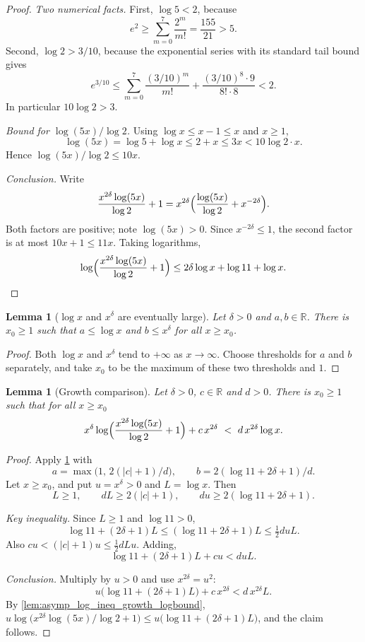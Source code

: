 \documentclass[11pt]{article}
\newtheorem{lemma}[theorem]{Lemma}
\theoremstyle{definition}
\theoremstyle{remark}
\begin{document}
\begin{proof}
\emph{Two numerical facts.} First, $\log 5<2$, because
\[
e^2\ge\sum_{m=0}^{7}\frac{2^m}{m!}=\frac{155}{21}>5.
\]
Second, $\log 2>3/10$, because the exponential series with its standard tail bound gives
\[
e^{3/10}\le\sum_{m=0}^{7}\frac{(3/10)^m}{m!}+\frac{(3/10)^8\cdot 9}{8!\cdot 8}<2.
\]
In particular $10\log2>3$.

\emph{Bound for $\log(5x)/\log 2$.} Using $\log x\le x-1\le x$ and $x\ge1$,
\[
\log(5x)=\log5+\log x\le 2+x\le 3x<10\log2\cdot x .
\]
Hence $\log(5x)/\log 2\le 10x$.

\emph{Conclusion.} Write
\[
\frac{x^{2\delta}\log(5x)}{\log2}+1=x^{2\delta}\Bigl(\frac{\log(5x)}{\log 2}+x^{-2\delta}\Bigr).
\]
Both factors are positive; note $\log(5x)>0$. Since $x^{-2\delta}\le1$, the second factor is at most $10x+1\le 11x$. Taking logarithms,
\[
\log\Bigl(\frac{x^{2\delta}\log(5x)}{\log2}+1\Bigr)\le 2\delta\log x+\log 11+\log x. \qedhere
\]
\end{proof}

\begin{lemma}[$\log x$ and $x^\delta$ are eventually large]\label{lem:asymp_log_ineq_growth_eventually}
Let $\delta>0$ and $a,b\in\mathbb{R}$. There is $x_0\ge1$ such that $a\le\log x$ and $b\le x^\delta$ for all $x\ge x_0$.
\end{lemma}

\begin{proof}
Both $\log x$ and $x^\delta$ tend to $+\infty$ as $x\to\infty$. Choose thresholds for $a$ and $b$ separately, and take $x_0$ to be the maximum of these two thresholds and $1$.
\end{proof}

\begin{lemma}[Growth comparison]\label{lem:asymp_log_ineq_growth}
Let $\delta>0$, $c\in\mathbb{R}$ and $d>0$. There is $x_0\ge1$ such that for all $x\ge x_0$
\[
x^{\delta}\log\Bigl(\frac{x^{2\delta}\log(5x)}{\log 2}+1\Bigr)+c\,x^{2\delta}\ <\ d\,x^{2\delta}\log x .
\]
\end{lemma}

\begin{proof}
Apply \cref{lem:asymp_log_ineq_growth_eventually} with
\[
a=\max\bigl(1,\,2(|c|+1)/d\bigr),\qquad b=2(\log 11+2\delta+1)/d .
\]
Let $x\ge x_0$, and put $u=x^\delta>0$ and $L=\log x$. Then
\[
L\ge1,\qquad dL\ge 2(|c|+1),\qquad du\ge 2(\log11+2\delta+1).
\]

\emph{Key inequality.} Since $L\ge1$ and $\log 11>0$,
\[
\log 11+(2\delta+1)L\le(\log11+2\delta+1)L\le\tfrac12 duL.
\]
Also $cu<(|c|+1)u\le\tfrac12 dLu$. Adding,
\[
\log 11+(2\delta+1)L+cu<duL.
\]

\emph{Conclusion.} Multiply by $u>0$ and use $x^{2\delta}=u^2$:
\[
u\bigl(\log11+(2\delta+1)L\bigr)+c\,x^{2\delta}<d\,x^{2\delta}L.
\]
By \cref{lem:asymp_log_ineq_growth_logbound}, $u\log\bigl(x^{2\delta}\log(5x)/\log2+1\bigr)\le u\bigl(\log 11+(2\delta+1)L\bigr)$, and the claim follows.
\end{proof}
\end{document}
